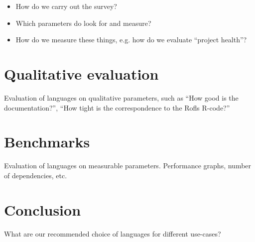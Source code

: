 \begin{itemize}
\item How do we carry out the survey?
\item Which parameters do look for and measure?
\item How do we measure these things, e.g. how do we evaluate ``project health''?
\end{itemize}

\chapter{Qualitative evaluation}
Evaluation of languages on qualitative parameters, such as ``How good
is the documentation?'', ``How tight is the correspondence to the
Rofls R-code?''

\chapter{Benchmarks}
Evaluation of languages on measurable parameters. Performance graphs,
number of dependencies, etc.

\chapter{Conclusion}
What are our recommended choice of languages for different use-cases?

